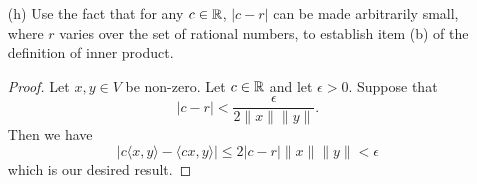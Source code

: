 \begin{enumerate}
        \begin{proof}
        Let \( c \in \R  \), \( r \in \Q  \), and \( x,y \in V  \). Using part (e), we can write
        \begin{align*}
        | c \langle x , y \rangle - \langle cx , y \rangle | &= | c \langle x , y \rangle - r \langle x , y \rangle + r \langle x , y \rangle  - \langle cx , y \rangle |   \\
                                                             &= | (c-r)\langle x , y \rangle  + \langle (r-c)x , y \rangle | \\ 
                                                             &= | (c-r) \langle x , y \rangle - \langle (c -r)x , y \rangle |.
    \end{align*}
    Working with the second equality, we can use the triangle inequality to write
    \begin{align*}
    | (c-r) \langle x , y \rangle + \langle (r-c)x , y \rangle | &\leq | (c-r) \langle x , y \rangle  | + | \langle (r-c)x , y \rangle |   \\  
                                                                 &= | c-r  | | \langle x , y \rangle | + | \langle (r-c)x , y \rangle | \\ 
                                                                 &\leq | c-r | \|x\|\|y\| + \|(r-c)x\| \|y\| \\ 
                                                                 &= | c-r  | \|x\| \|y\| + | c-r  | \|x\| \|y\|  \\
                                                                 &= 2 | c-r  | \|x\| \|y\|.
\end{align*}
Hence, we conclude that
        \[ | c \langle x , y \rangle - \langle cx , y \rangle | = | (c-r)\langle x , y \rangle - \langle (c-r)x ,y  \rangle | \leq 2 | c - r  |  \|x\| \|y\|.   \]
        \end{proof}
    \item[(h)] Use the fact that for any \( c \in \R  \), \( | c -r  |  \) can be made arbitrarily small, where \( r  \) varies over the set of rational numbers, to establish item (b) of the definition of inner product.
        \begin{proof}
        Let \( x,y \in V  \) be non-zero. Let \( c \in \R  \) and let \( \epsilon > 0  \). Suppose that
        \[  | c - r  |  < \frac{ \epsilon  }{ 2 \|x \| \|y\| }. \]
        Then we have
        \[  | c \langle x  , y \rangle - \langle cx , y \rangle |  \leq 2 | c - r  |  \| x \| \|y\| < \epsilon     \]
        which is our desired result.
        \end{proof}
\end{enumerate}

